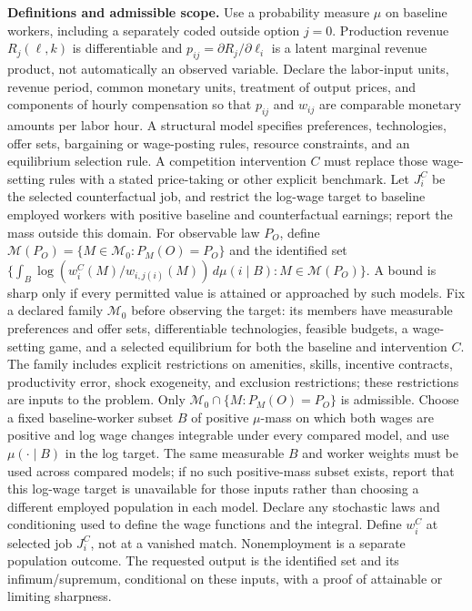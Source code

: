 \documentclass[11pt,a4paper]{article}
\begin{document}
\textbf{Definitions and admissible scope.} Use a probability measure \(\mu\) on baseline workers, including a separately coded outside option \(j=0\). Production revenue \(R_j(\ell,k)\) is differentiable and \(p_{ij}=\partial R_j/\partial\ell_i\) is a latent marginal revenue product, not automatically an observed variable. Declare the labor-input units, revenue period, common monetary units, treatment of output prices, and components of hourly compensation so that \(p_{ij}\) and \(w_{ij}\) are comparable monetary amounts per labor hour. A structural model specifies preferences, technologies, offer sets, bargaining or wage-posting rules, resource constraints, and an equilibrium selection rule. A competition intervention \(C\) must replace those wage-setting rules with a stated price-taking or other explicit benchmark. Let \(J_i^C\) be the selected counterfactual job, and restrict the log-wage target to baseline employed workers with positive baseline and counterfactual earnings; report the mass outside this domain. For observable law \(P_O\), define \(\mathcal M(P_O)=\{M\in\mathcal M_0:P_M(O)=P_O\}\) and the identified set \(\{\int_B\log(w_i^C(M)/w_{i,j(i)}(M))\,d\mu(i\mid B):M\in\mathcal M(P_O)\}\). A bound is sharp only if every permitted value is attained or approached by such models. Fix a declared family \(\mathcal M_0\) before observing the target: its members have measurable preferences and offer sets, differentiable technologies, feasible budgets, a wage-setting game, and a selected equilibrium for both the baseline and intervention \(C\). The family includes explicit restrictions on amenities, skills, incentive contracts, productivity error, shock exogeneity, and exclusion restrictions; these restrictions are inputs to the problem. Only \(\mathcal M_0\cap\{M:P_M(O)=P_O\}\) is admissible. Choose a fixed baseline-worker subset \(B\) of positive \(\mu\)-mass on which both wages are positive and log wage changes integrable under every compared model, and use \(\mu(\cdot\mid B)\) in the log target. The same measurable \(B\) and worker weights must be used across compared models; if no such positive-mass subset exists, report that this log-wage target is unavailable for those inputs rather than choosing a different employed population in each model. Declare any stochastic laws and conditioning used to define the wage functions and the integral. Define \(w_i^C\) at selected job \(J_i^C\), not at a vanished match. Nonemployment is a separate population outcome. The requested output is the identified set and its infimum/supremum, conditional on these inputs, with a proof of attainable or limiting sharpness.
\end{document}

